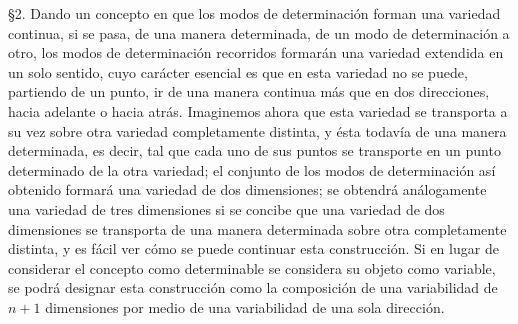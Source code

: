 \documentclass[a4paper, 12pt]{article}
\begin{document}
\S 2.\hspace{3 mm} Dando un concepto en que los modos de determinación forman una variedad continua, si se pasa, de una manera determinada, de un modo de determinación a otro, los modos de determinación recorridos formarán una variedad extendida en un solo sentido, cuyo carácter esencial es que en esta variedad no se puede, partiendo de un punto, ir de una manera continua más que en dos direcciones, hacia adelante o hacia atrás. Imaginemos ahora que esta variedad se transporta a su vez sobre otra variedad completamente distinta, y ésta todavía de una manera determinada, es decir, tal que cada uno de sus puntos se transporte en un punto determinado de la otra variedad; el conjunto de los modos de determinación así obtenido formará una variedad de dos dimensiones; se obtendrá análogamente una variedad de tres dimensiones si se concibe que una variedad de dos dimensiones se transporta de una manera determinada sobre otra completamente distinta, y es fácil ver cómo se puede continuar esta construcción. Si en lugar de considerar el concepto como determinable se considera su objeto como variable, se podrá designar esta construcción como la composición de una variabilidad de $n + 1$ dimensiones por medio de una variabilidad de una sola dirección.
   
\bigskip
   
\end{document}
